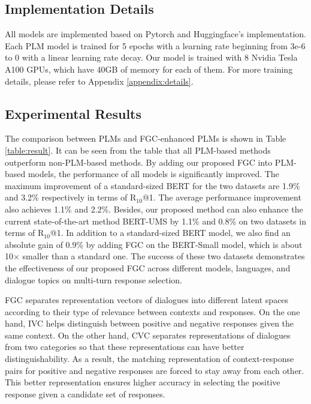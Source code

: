 \documentclass[letterpaper]{article} \usepackage{aaai22}  \usepackage{times}  \usepackage{helvet}  \usepackage{courier}  \usepackage[hyphens]{url}  \usepackage{graphicx} \urlstyle{rm} \def\UrlFont{\rm}  \usepackage{natbib}  \usepackage{caption} \DeclareCaptionStyle{ruled}{labelfont=normalfont,labelsep=colon,strut=off} \frenchspacing  \setlength{\pdfpagewidth}{8.5in}  \setlength{\pdfpageheight}{11in}  \usepackage{algorithm}
\begin{document}
\subsection{Implementation Details}

All models are implemented based on Pytorch and Huggingface's implementation. Each PLM model is trained for 5 epochs with a learning rate beginning from 3e-6 to 0 with a linear learning rate decay. Our model is trained with 8 Nvidia Tesla A100 GPUs, which have 40GB of memory for each of them. For more training details, please refer to Appendix \ref{appendix:details}.

\subsection{Experimental Results}

The comparison between PLMs and FGC-enhanced PLMs is shown in Table \ref{table:result}. It can be seen from the table that all PLM-based methods outperform non-PLM-based methods. By adding our proposed FGC into PLM-based models, the performance of all models is significantly improved. The maximum improvement of a standard-sized BERT for the two datasets are 1.9\% and 3.2\% respectively in terms of R$_{10}$@1. The average performance improvement also achieves 1.1\% and 2.2\%. Besides, our proposed method can also enhance the current state-of-the-art method BERT-UMS by 1.1\% and 0.8\% on two datasets in terms of R$_{10}$@1. In addition to a standard-sized BERT model, we also find an absolute gain of 0.9\% by adding FGC on the BERT-Small model, which is about 10$\times$ smaller than a standard one. The success of these two datasets demonstrates the effectiveness of our proposed FGC across different models, languages, and dialogue topics on multi-turn response selection. 

FGC separates representation vectors of dialogues into different latent spaces according to their type of relevance between contexts and responses. On the one hand, IVC helps distinguish between positive and negative responses given the same context. On the other hand, CVC separates representations of dialogues from two categories so that these representations can have better distinguishability. As a result, the matching representation of context-response pairs for positive and negative responses are forced to stay away from each other. This better representation ensures higher accuracy in selecting the positive response given a candidate set of responses. 
\end{document}
